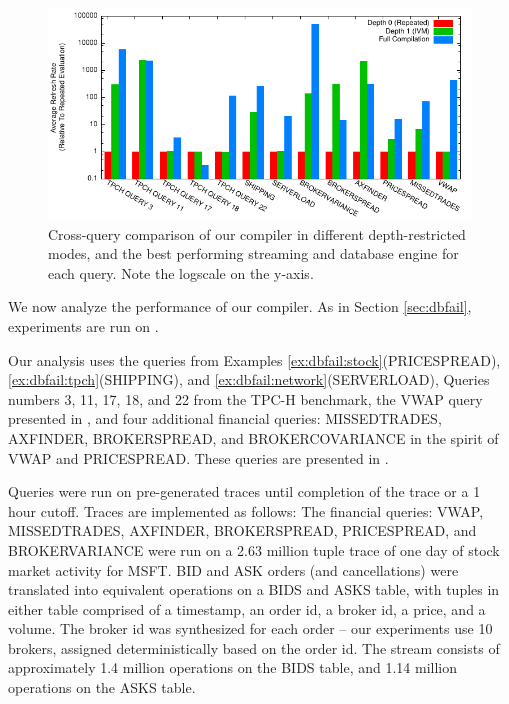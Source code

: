 
\begin{figure}
\begin{center}
\includegraphics[width=\textwidth]{../graphs/graphs/bakeoff.pdf}
\caption{Cross-query comparison of our compiler in different depth-restricted modes, and the best performing streaming and database engine for each query.  Note the logscale on the y-axis.}
\label{fig:experiments:bakeoff}
\end{center}
\end{figure}

We now analyze the performance of our compiler.  As in Section \ref{sec:dbfail}, experiments are run on . 
 
Our analysis uses the queries from Examples \ref{ex:dbfail:stock}(PRICESPREAD),  \ref{ex:dbfail:tpch}(SHIPPING), and \ref{ex:dbfail:network}(SERVERLOAD), Queries numbers 3, 11, 17, 18, and 22 from the TPC-H\cite{tpch} benchmark, the VWAP query presented in \cite{kennedy-ahmad-koch-cidr:11}, and four additional financial queries: MISSEDTRADES, AXFINDER, BROKERSPREAD, and BROKERCOVARIANCE in the spirit of VWAP and PRICESPREAD.  These queries are presented in .

Queries were run on pre-generated traces until completion of the trace or a 1 hour cutoff.  Traces are implemented as follows: The financial queries: VWAP, MISSEDTRADES, AXFINDER, BROKERSPREAD, PRICESPREAD, and BROKERVARIANCE were run on a 2.63 million tuple trace of one day of stock market activity for MSFT.  BID and ASK orders (and cancellations) were translated into equivalent operations on a BIDS and ASKS table, with tuples in either table comprised of a timestamp, an order id, a broker id, a price, and a volume.  The broker id was synthesized for each order -- our experiments use 10 brokers, assigned deterministically based on the order id.  The stream consists of approximately 1.4 million operations on the BIDS table, and 1.14 million operations on the ASKS table.

